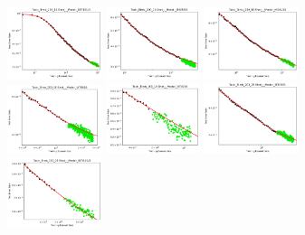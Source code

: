 \documentclass{article} %
\begin{document}
\begin{figure}[!htb]
\includegraphics[width=0.245\textwidth]{figures/scaling_laws_benchmark_dataset_plots/birds_10___BiT_101_3.png}
\includegraphics[width=0.245\textwidth]{figures/scaling_laws_benchmark_dataset_plots/birds_10___MiX_B_16.png}
\includegraphics[width=0.245\textwidth]{figures/scaling_laws_benchmark_dataset_plots/birds_10___MiX_L_16.png}
\includegraphics[width=0.245\textwidth]{figures/scaling_laws_benchmark_dataset_plots/birds_10___ViT_B_16.png}
\includegraphics[width=0.245\textwidth]{figures/scaling_laws_benchmark_dataset_plots/birds_10___ViT_S_16.png}
\includegraphics[width=0.245\textwidth]{figures/scaling_laws_benchmark_dataset_plots/birds_25___BiT_50_1.png}
\includegraphics[width=0.245\textwidth]{figures/scaling_laws_benchmark_dataset_plots/birds_25___BiT_101_3.png}

\end{figure}
\end{document}
